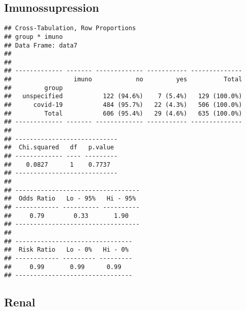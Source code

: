 \documentclass[
]{article}
\newenvironment{Shaded}{\begin{snugshade}}{\end{snugshade}}
\newcommand{\DataTypeTok}[1]{\textcolor[rgb]{0.13,0.29,0.53}{#1}}
\newcommand{\KeywordTok}[1]{\textcolor[rgb]{0.13,0.29,0.53}{\textbf{#1}}}
\newcommand{\NormalTok}[1]{#1}
\newcommand{\OperatorTok}[1]{\textcolor[rgb]{0.81,0.36,0.00}{\textbf{#1}}}
\newcommand{\OtherTok}[1]{\textcolor[rgb]{0.56,0.35,0.01}{#1}}
\newcommand{\StringTok}[1]{\textcolor[rgb]{0.31,0.60,0.02}{#1}}
\begin{document}
\hypertarget{imunossupression}{%
\subsection{Imunossupression}\label{imunossupression}}

\begin{Shaded}
\end{Shaded}

\begin{verbatim}
## Cross-Tabulation, Row Proportions  
## group * imuno  
## Data Frame: data7  
## 
## 
## ------------- ------- ------------- ----------- --------------
##                 imuno            no         yes          Total
##         group                                                 
##   unspecified           122 (94.6%)    7 (5.4%)   129 (100.0%)
##      covid-19           484 (95.7%)   22 (4.3%)   506 (100.0%)
##         Total           606 (95.4%)   29 (4.6%)   635 (100.0%)
## ------------- ------- ------------- ----------- --------------
## 
## ----------------------------
##  Chi.squared   df   p.value 
## ------------- ---- ---------
##    0.0827      1    0.7737  
## ----------------------------
## 
## ----------------------------------
##  Odds Ratio   Lo - 95%   Hi - 95% 
## ------------ ---------- ----------
##     0.79        0.33       1.90   
## ----------------------------------
## 
## --------------------------------
##  Risk Ratio   Lo - 0%   Hi - 0% 
## ------------ --------- ---------
##     0.99       0.99      0.99   
## --------------------------------
\end{verbatim}

\hypertarget{renal}{%
\subsection{Renal}\label{renal}}

\begin{Shaded}
\end{Shaded}
\end{document}

